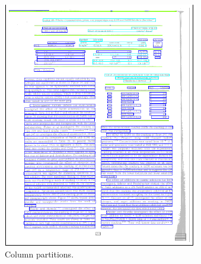 \begin{figure}
\begin{subfigure}{0.30\textwidth}
\includegraphics[width=\linewidth]{img/tableDetection/tableDetectionPartitions.pdf}
\caption{Column partitions.}
\label{fig:tessTableDet2}
\end{subfigure}
\quad
\begin{subfigure}{0.30\textwidth}

\end{subfigure}
\end{figure}
